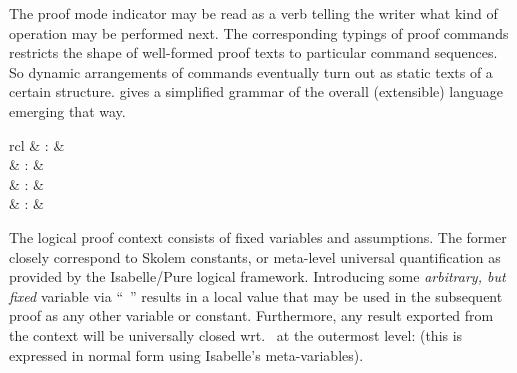 \begin{isabellebody}
\begin{isamarkuptext}
  The proof mode indicator may be read as a verb telling the writer
  what kind of operation may be performed next.  The corresponding
  typings of proof commands restricts the shape of well-formed proof
  texts to particular command sequences.  So dynamic arrangements of
  commands eventually turn out as static texts of a certain structure.
   gives a simplified grammar of the overall
  (extensible) language emerging that way.%
\end{isamarkuptext}%
\isamarkuptrue%
%
\isamarkuptrue%
%
\begin{isamarkuptext}%
\begin{matharray}{rcl}
    \mbox{} & : &  \\
    \mbox{} & : &  \\
    \mbox{} & : &  \\
    \mbox{} & : &  \\
  \end{matharray}

  The logical proof context consists of fixed variables and
  assumptions.  The former closely correspond to Skolem constants, or
  meta-level universal quantification as provided by the Isabelle/Pure
  logical framework.  Introducing some \emph{arbitrary, but fixed}
  variable via ``\mbox{}~'' results in a local value
  that may be used in the subsequent proof as any other variable or
  constant.  Furthermore, any result  exported from
  the context will be universally closed wrt.\  at the
  outermost level:  (this is expressed in normal
  form using Isabelle's meta-variables).


\end{isamarkuptext}
\end{isabellebody}
